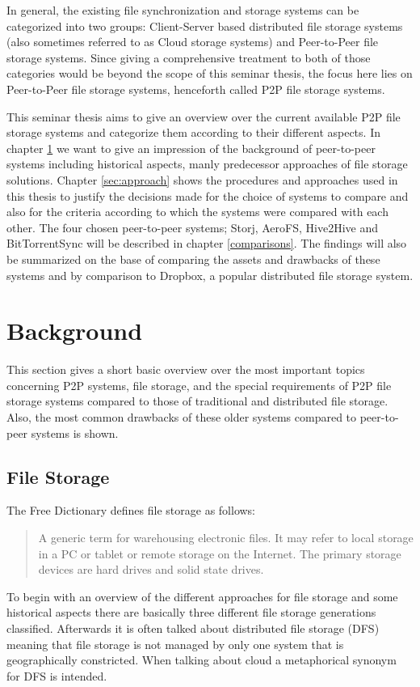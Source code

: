 In general, the existing file synchronization and storage systems can be categorized into two groups: Client-Server based distributed file storage systems (also sometimes referred to as Cloud storage systems) and Peer-to-Peer file storage systems. Since giving a comprehensive treatment to both of those categories would be beyond the scope of this seminar thesis, the focus here lies on Peer-to-Peer file storage systems, henceforth called P2P file storage systems.

This seminar thesis aims to give an overview over the current available P2P file storage systems and categorize them according to their different aspects. In chapter \ref{sec:background} we want to give an impression of the background of peer-to-peer systems including historical aspects, manly predecessor approaches of file storage solutions. Chapter \ref{sec:approach} shows the procedures and approaches used in this thesis to justify the decisions made for the choice of systems to compare and also for the criteria according to which the systems were compared with each other. The four chosen peer-to-peer systems; Storj, AeroFS, Hive2Hive and BitTorrentSync will be described in chapter \ref{comparisons}. The findings will also be summarized on the base of comparing the assets and drawbacks of these systems and by comparison to Dropbox, a popular distributed file storage system.

\section{Background} %
\label{sec:background}
This section gives a short basic overview over the most important topics concerning P2P systems, file storage, and the special requirements of P2P file storage systems compared to those of traditional and distributed file storage. Also, the most common drawbacks of these older systems compared to peer-to-peer systems is shown.

\subsection{File Storage}
The Free Dictionary defines file storage as follows:
\begin{quote}
A generic term for warehousing electronic files. It may refer to local storage in a PC or tablet or remote storage on the Internet. The primary storage devices are hard drives and solid state drives\cite{thefreedictionary}.
\end{quote}
To begin with an overview of the different approaches for file storage and some historical aspects there are basically three different file storage generations classified. Afterwards it is often talked about distributed file storage (DFS) meaning that file storage is not managed by only one system that is geographically constricted. When talking about cloud a metaphorical synonym for DFS is intended.


